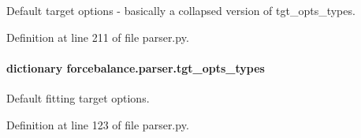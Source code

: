 Default target options -\/ basically a collapsed version of tgt\-\_\-opts\-\_\-types. 



Definition at line 211 of file parser.\-py.

\hypertarget{namespaceforcebalance_1_1parser_a95436b7fb9e99bd7b9f0a040b15fbe3a}{
\paragraph[{tgt\-\_\-opts\-\_\-types}]{\setlength{\rightskip}{0pt plus 5cm}dictionary forcebalance.\-parser.\-tgt\-\_\-opts\-\_\-types}}\label{namespaceforcebalance_1_1parser_a95436b7fb9e99bd7b9f0a040b15fbe3a}


Default fitting target options. 



Definition at line 123 of file parser.\-py.

